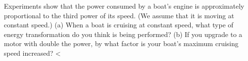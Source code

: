Experiments show that the power consumed by a boat's
        engine is approximately proportional to the third power of its
        speed. (We assume that it is moving at constant speed.)\hwendpart
         (a)
        When a boat is cruising at constant speed, what type of
        energy transformation do you think is being performed? \hwendpart
        (b)
        If you upgrade to a motor with double the power, by what
        factor is your boat's maximum cruising speed increased?
        <%
